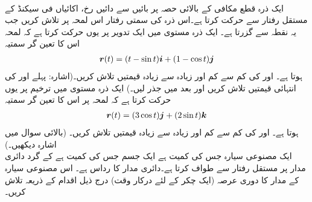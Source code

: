 \\
ایک ذرہ قطع مکافی  کے بالائی حصہ پر بائیں سے دائیں رخ،  اکائیاں فی سیکنڈ کے  مستقل رفتار   سے  حرکت کرتا ہے۔اس ذرہ کی سمتی رفتار اس لمحہ  پر تلاش کریں جب یہ نقطہ  سے گزرتا ہے۔
ایک ذرہ  مستوی  میں ایک  تدویر پر یوں حرکت کرتا ہے کہ لمحہ  اس کا تعین گر سمتیہ 
\begin{align*}
{\ensuremath{{\boldsymbol{r}}}}(t)=(t-\sin t){\boldsymbol{i}}+(1-\cos t){\boldsymbol{j}}
\end{align*}
ہوتا ہے۔  اور  کی کم سے کم اور زیادہ سے زیادہ قیمتیں تلاش کریں۔(اشارہ: پہلے  اور  کی انتہائی قیمتیں تلاش کریں اور بعد میں جذر لیں۔)
ایک ذرہ  مستوی  میں ترخیم  پر یوں  حرکت  کرتا ہے کہ لمحہ  پر اس کا  تعین گر سمتیہ 
\begin{align*}
{\ensuremath{{\boldsymbol{r}}}}(t)=(3\cos t){\boldsymbol{j}}+(2\sin t){\boldsymbol{k}}
\end{align*}
ہوتا ہے۔  اور  کی کم سے کم اور زیادہ سے زیادہ قیمتیں تلاش کریں۔ (بالائی سوال میں اشارہ  دیکھیں۔)
\\
ایک مصنوعی سیارہ جس کی کمیت  ہے ایک جسم جس کی کمیت  ہے کے گرد دائری مدار  پر  مستقل رفتار  سے  طواف کرتا ہے۔دائری مدار کا رداس  ہے۔ اس مصنوعی سیارہ کے مدار کا    دوری عرصہ   (ایک چکر کے لئے درکار وقت)   درج ذیل اقدام کے ذریعہ تلاش کریں۔
